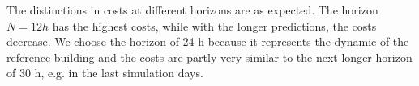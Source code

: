 The distinctions in costs at different horizons are as expected. The horizon $N = 12 h$ has the highest costs, while with the longer predictions, the costs decrease.\newline 
We choose the horizon of 24 h because it represents the dynamic of the reference building and the costs are partly very similar to the next longer horizon of 30 h, e.g. in the last simulation days.
